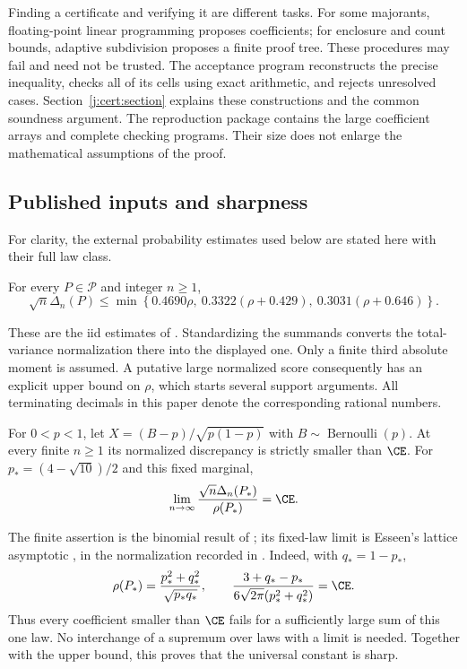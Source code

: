Finding a certificate and verifying it are different tasks. For some
majorants, floating-point linear programming proposes coefficients;
for enclosure and count bounds, adaptive subdivision proposes a
finite proof tree. These procedures may fail and need not be trusted.
The acceptance program reconstructs the precise inequality, checks
all of its cells using exact arithmetic, and rejects unresolved cases.
Section~\ref{j:cert:section} explains these constructions and the
common soundness argument. The reproduction package contains the
large coefficient arrays and complete checking programs. Their size
does not enlarge the mathematical assumptions of the proof.

\subsection{Published inputs and sharpness}

For clarity, the external probability estimates used below are stated
here with their full law class.
\begin{proposition}\label{j:external:affine}
For every $P\in\mathcal P$ and integer $n\ge1$,
\[
 \sqrt n\Delta_n(P)\le
 \min\left\{0.4690\rho,\ 0.3322(\rho+0.429),\
                         0.3031(\rho+0.646)\right\}.
\]
\end{proposition}
These are the iid estimates of \citet{Shevtsova2013}. Standardizing
the summands converts the total-variance normalization there into the
displayed one. Only a finite third absolute moment is assumed. A
putative large normalized score consequently has an explicit upper
bound on $\rho$, which starts several support arguments. All
terminating decimals in this paper denote the corresponding rational
numbers.

\begin{proposition}[Finite binomial comparison and the lower limit]
\label{j:external:binomial}\label{j:external:limit}
For $0<p<1$, let $X=(B-p)/\sqrt{p(1-p)}$ with
$B\sim\operatorname{Bernoulli}(p)$. At every finite $n\ge1$ its
normalized discrepancy is strictly smaller than $\CE$.
For $p_*=(4-\sqrt{10})/2$ and this fixed marginal,
\[
 \lim_{n\to\infty}\frac{\sqrt n\Delta_n(P_*)}{\rho(P_*)}=\CE.
\]
\end{proposition}
The finite assertion is the binomial result of
\citet[Theorem~1]{Schulz2016}; its fixed-law limit is Esseen's lattice
asymptotic \cite{Esseen1956}, in the normalization recorded in
\citet[Remarks~4.1--4.2]{Schulz2016}. Indeed, with $q_*=1-p_*$,
\[
 \rho(P_*)=\frac{p_*^2+q_*^2}{\sqrt{p_*q_*}},\qquad
 \frac{3+q_*-p_*}{6\sqrt{2\pi}(p_*^2+q_*^2)}=\CE.
\]
Thus every coefficient smaller than $\CE$ fails for a sufficiently
large sum of this one law. No interchange of a supremum over laws
with a limit is needed. Together with the upper bound, this proves
that the universal constant is sharp.


